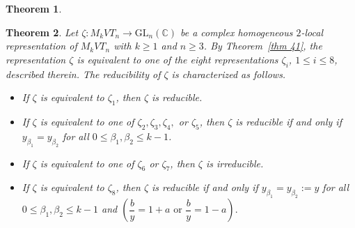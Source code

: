 \documentclass[10pt,a4paper]{amsart}
\newtheorem{theorem}{Theorem}
\begin{document}
\begin{theorem}
\end{theorem}

\begin{theorem}
Let $
\zeta : M_kVT_n \longrightarrow \mathrm{GL}_n(\mathbb{C})$
be a complex homogeneous \(2\)-local representation of \(M_kVT_n\) with
$k\geq 1$ and $n \ge 3$. By Theorem~\ref{thm 41}, the representation $\zeta$ is equivalent to one of the eight
representations $\zeta_i$, $1 \le i \le 8$, described therein.
The reducibility of $\zeta$ is characterized as follows.
\begin{itemize}
    \item[(a)] If $\zeta$ is equivalent to $\zeta_1$, then $\zeta$ is reducible.
    \item[(b)] If $\zeta$ is equivalent to one of $\zeta_2, \zeta_3, \zeta_4,$ or $\zeta_5$,
    then $\zeta$ is reducible if and only if
    $y_{\beta_1}=y_{\beta_2}$ for all $0 \le \beta_1, \beta_2 \le k-1$.
    \item[(c)] If $\zeta$ is equivalent to one of $\zeta_6$ or $\zeta_7$,
    then $\zeta$ is irreducible.
    \item[(d)] If $\zeta$ is equivalent to $\zeta_8$, then $\zeta$ is reducible
    if and only if $y_{\beta_1}=y_{\beta_2}:=y$ for all $0 \le \beta_1, \beta_2 \le k-1$ and $\left( \dfrac{b}{y}=1+a \text{ \ or\ \  } \dfrac{b}{y}=1-a\right).$
\end{itemize}
\end{theorem}
\end{document}
